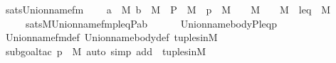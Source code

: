 \begin{isabellebody}
\endisatagproof
{\isafoldproof}%
%
\isadelimproof
\isanewline
%
\endisadelimproof
\isanewline
{}\isamarkupfalse%
\ sats{\isacharunderscore}{\kern0pt}Union{\isacharunderscore}{\kern0pt}name{\isacharunderscore}{\kern0pt}fm\ {\isacharcolon}{\kern0pt}\isanewline
\ \ {\isachardoublequoteopen}{\isasymlbrakk}\ a\ {\isasymin}\ M{\isacharsemicolon}{\kern0pt}\ b\ {\isasymin}\ M\ {\isacharsemicolon}{\kern0pt}\ P{\isacharprime}{\kern0pt}\ {\isasymin}\ M\ {\isacharsemicolon}{\kern0pt}\ p\ {\isasymin}\ M\ {\isacharsemicolon}{\kern0pt}\ {\isasymtheta}\ {\isasymin}\ M\ {\isacharsemicolon}{\kern0pt}\ {\isasymtau}\ {\isasymin}\ M\ {\isacharsemicolon}{\kern0pt}\ leq{\isacharprime}{\kern0pt}\ {\isasymin}\ M\ {\isasymrbrakk}\ {\isasymLongrightarrow}\isanewline
\ \ \ \ \ sats{\isacharparenleft}{\kern0pt}M{\isacharcomma}{\kern0pt}Union{\isacharunderscore}{\kern0pt}name{\isacharunderscore}{\kern0pt}fm{\isacharcomma}{\kern0pt}{\isacharbrackleft}{\kern0pt}{\isasymlangle}{\isasymtheta}{\isacharcomma}{\kern0pt}p{\isasymrangle}{\isacharcomma}{\kern0pt}{\isasymtau}{\isacharcomma}{\kern0pt}leq{\isacharprime}{\kern0pt}{\isacharcomma}{\kern0pt}P{\isacharprime}{\kern0pt}{\isacharbrackright}{\kern0pt}{\isacharat}{\kern0pt}{\isacharbrackleft}{\kern0pt}a{\isacharcomma}{\kern0pt}b{\isacharbrackright}{\kern0pt}{\isacharparenright}{\kern0pt}\ {\isasymlongleftrightarrow}\isanewline
\ \ \ \ \ Union{\isacharunderscore}{\kern0pt}name{\isacharunderscore}{\kern0pt}body{\isacharparenleft}{\kern0pt}P{\isacharprime}{\kern0pt}{\isacharcomma}{\kern0pt}leq{\isacharprime}{\kern0pt}{\isacharcomma}{\kern0pt}{\isasymtau}{\isacharcomma}{\kern0pt}{\isasymlangle}{\isasymtheta}{\isacharcomma}{\kern0pt}p{\isasymrangle}{\isacharparenright}{\kern0pt}{\isachardoublequoteclose}\isanewline
%
\isadelimproof
\ \ %
\endisadelimproof
%
\isatagproof
{}\isamarkupfalse%
\ Union{\isacharunderscore}{\kern0pt}name{\isacharunderscore}{\kern0pt}fm{\isacharunderscore}{\kern0pt}def\ Union{\isacharunderscore}{\kern0pt}name{\isacharunderscore}{\kern0pt}body{\isacharunderscore}{\kern0pt}def\ tuples{\isacharunderscore}{\kern0pt}in{\isacharunderscore}{\kern0pt}M\isanewline
\ \ \isamarkupfalse%
\ {\isacharparenleft}{\kern0pt}subgoal{\isacharunderscore}{\kern0pt}tac\ {\isachardoublequoteopen}{\isasymlangle}{\isasymtheta}{\isacharcomma}{\kern0pt}p{\isasymrangle}\ {\isasymin}\ M{\isachardoublequoteclose}{\isacharcomma}{\kern0pt}\ auto\ simp\ add\ {\isacharcolon}{\kern0pt}\ tuples{\isacharunderscore}{\kern0pt}in{\isacharunderscore}{\kern0pt}M{\isacharparenright}{\kern0pt}%
\endisatagproof
{\isafoldproof}%

\end{isabellebody}
